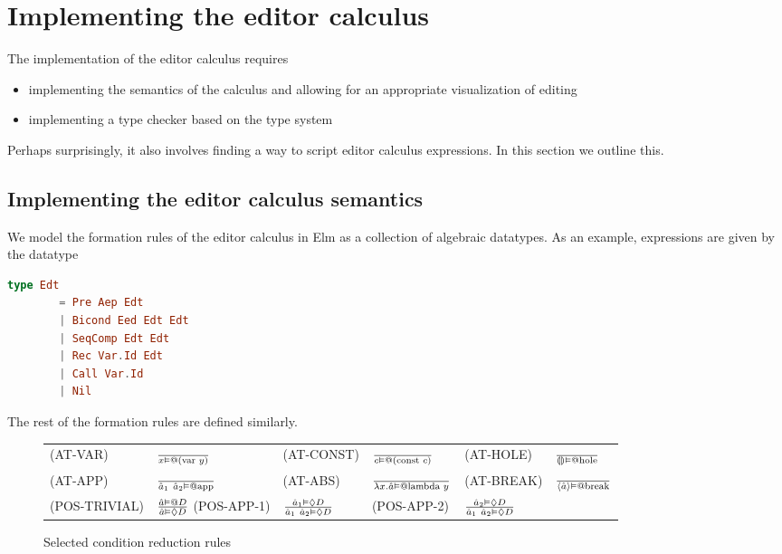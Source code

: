 \section{Implementing the editor calculus}
\label{sec:implementing}

The implementation of the editor calculus requires
%
\begin{itemize}
  \item implementing the semantics of the calculus and allowing for an
        appropriate visualization of editing
  \item implementing a type checker based on the type system
\end{itemize}
%
Perhaps surprisingly, it also involves finding a way to script editor
calculus expressions. In this section we outline this.

\subsection{Implementing the editor calculus semantics}

We model the formation rules of the editor calculus in Elm as a collection of
algebraic datatypes. As an example, expressions are given by the
datatype

\begin{lstlisting}[language=elm,%
           label={edt-without-holes-definitions},%
           gobble=4,%
           caption={Formation rules (\ref{edt-formation-rules}) modeled in Elm},%
           ]
    type Edt
        = Pre Aep Edt
        | Bicond Eed Edt Edt
        | SeqComp Edt Edt
        | Rec Var.Id Edt
        | Call Var.Id
        | Nil
\end{lstlisting}
The rest of the formation rules are defined similarly.


\begin{figure}
  \center
  \renewcommand{\arraystretch}{2}
  \begin{tabular}{llllll}
    \scriptsize(AT-VAR)      & $\frac{} {x \vDash @(\text{var }y)}$      & \scriptsize(AT-CONST)  & $\frac{} {c \vDash @(\text{const }c)}$   & \scriptsize(AT-HOLE)  & $\frac{} {\llparenthesis\rrparenthesis \vDash @\text{hole}}$  \\
    \scriptsize(AT-APP)      & $\frac{} {\hat{a}_1~\hat{a}_2 \vDash @\text{app}}$      & \scriptsize(AT-ABS)    & $\frac{} {\lambda x.\hat{a} \vDash @\text{lambda }y}$     & \scriptsize(AT-BREAK) & $\frac{} {\langle \hat{a} \rangle \vDash @\text{break}}$ \\
    \scriptsize(POS-TRIVIAL) & $\frac{\hat{a} \vDash @D} {\hat{a} \vDash \Diamond D}$                                                                              %
    \scriptsize(POS-APP-1)   & $\frac{\hat{a}_1 \vDash \Diamond D} {\hat{a}_1~\hat{a}_2 \vDash \Diamond D}$  & \scriptsize(POS-APP-2) & $\frac{\hat{a}_2 \vDash \Diamond D} {\hat{a}_1~\hat{a}_2 \vDash \Diamond D}$                                      %
  \end{tabular}
  \caption{Selected condition reduction rules}
  \label{fig:conditionreductionrules}
\end{figure}


